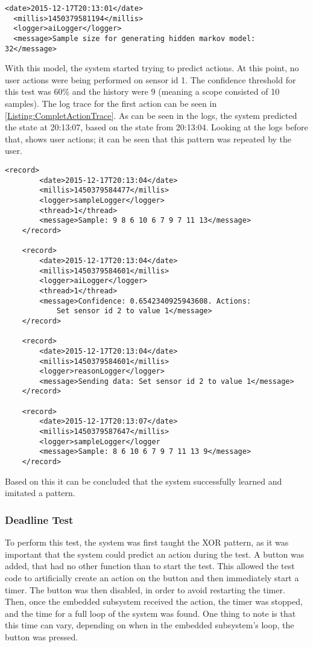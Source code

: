 \lstset{language=xml}
\begin{lstlisting}[label = Listing:MarkovGenLog, caption = Snippet of log from model generation]
  <date>2015-12-17T20:13:01</date>
  <millis>1450379581194</millis>
  <logger>aiLogger</logger>
  <message>Sample size for generating hidden markov model: 32</message>
\end{lstlisting}

With this model, the system started trying to predict actions. At this point, no user actions were being performed on sensor id 1. The confidence threshold for this test was 60\% and the history were 9 (meaning a scope consisted of 10 samples). The log trace for the first action can be seen in \cref{Listing:CompletActionTrace}. As can be seen in the logs, the system predicted the state at 20:13:07, based on the state from 20:13:04. Looking at the logs before that, shows user actions; it can be seen that this pattern was repeated by the user.

\begin{lstlisting}[label = Listing:CompletActionTrace, caption = Snippets from different logs to show how the process of making an action]
    <record>
        <date>2015-12-17T20:13:04</date>
        <millis>1450379584477</millis>
        <logger>sampleLogger</logger>
        <thread>1</thread>
        <message>Sample: 9 8 6 10 6 7 9 7 11 13</message>
    </record>

    <record>
        <date>2015-12-17T20:13:04</date>
        <millis>1450379584601</millis>
        <logger>aiLogger</logger>
        <thread>1</thread>
        <message>Confidence: 0.6542340925943608. Actions:
            Set sensor id 2 to value 1</message>
    </record>

    <record>
        <date>2015-12-17T20:13:04</date>
        <millis>1450379584601</millis>
        <logger>reasonLogger</logger>
        <message>Sending data: Set sensor id 2 to value 1</message>
    </record>

    <record>
        <date>2015-12-17T20:13:07</date>
        <millis>1450379587647</millis>
        <logger>sampleLogger</logger
        <message>Sample: 8 6 10 6 7 9 7 11 13 9</message>
    </record>
\end{lstlisting}

Based on this it can be concluded that the system successfully learned and imitated a pattern.

\subsubsection{Deadline Test}\label{subsub:deadline}
To perform this test, the system was first taught the XOR pattern, as it was important that the system could predict an action during the test. A button was added, that had no other function than to start the test. This allowed the test code to artificially create an action on the button and then immediately start a timer. The button was then disabled, in order to avoid restarting the timer. Then, once the embedded subsystem received the action, the timer was stopped, and the time for a full loop of the system was found. One thing to note is that this time can vary, depending on when in the embedded subsystem's loop, the button was pressed.

